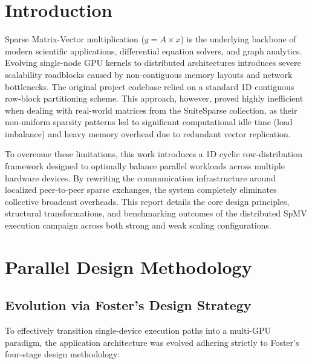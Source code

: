 \documentclass[conference]{IEEEtran}
\begin{document}
\section{Introduction}
Sparse Matrix-Vector multiplication ($y = A \times x$) is the underlying backbone of modern scientific applications, differential equation solvers, and graph analytics. Evolving single-node GPU kernels to distributed architectures introduces severe scalability roadblocks caused by non-contiguous memory layouts and network bottlenecks. 
The original project codebase relied on a standard 1D contiguous row-block partitioning scheme. This approach, however, proved highly inefficient when dealing with real-world matrices from the SuiteSparse collection, as their non-uniform sparsity patterns led to significant computational idle time (load imbalance) and heavy memory overhead due to redundant vector replication.

To overcome these limitations, this work introduces a 1D cyclic row-distribution framework designed to optimally balance parallel workloads across multiple hardware devices. By rewriting the communication infrastructure around localized peer-to-peer sparse exchanges, the system completely eliminates collective broadcast overheads. This report details the core design principles, structural transformations, and benchmarking outcomes of the distributed SpMV execution campaign across both strong and weak scaling configurations.
\section{Parallel Design Methodology}

\subsection{Evolution via Foster's Design Strategy}
To effectively transition single-device execution paths into a multi-GPU paradigm, the application architecture was evolved adhering strictly to Foster's four-stage design methodology:
\end{document}
